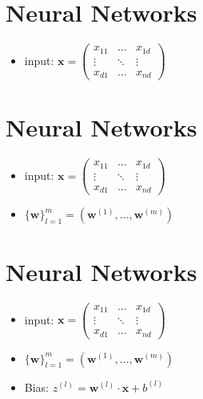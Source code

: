 \documentclass[11pt]{article}
\begin{document}
\newpage
\hypertarget{neural-networks}{%
\section*{Neural Networks}\label{neural-networks1}}

\begin{itemize}
    \item input: $\boldsymbol{x} = 
        \begin{pmatrix}
            x_{11} & \dots & x_{1d} \\
            \vdots & \ddots & \vdots \\
            x_{d1} & \dots & x_{nd}
        \end{pmatrix}$
\end{itemize}

\newpage
\hypertarget{neural-networks}{%
\section*{Neural Networks}\label{neural-networks2}}

\begin{itemize}
    \item input: $\boldsymbol{x} = 
        \begin{pmatrix}
            x_{11} & \dots & x_{1d} \\
            \vdots & \ddots & \vdots \\
            x_{d1} & \dots & x_{nd}
        \end{pmatrix}$
    \item $\{\boldsymbol{w}\}^m_{l=1} = \left(\boldsymbol{w}^{(1)},\dots,\boldsymbol{w}^{(m)}\right)$
\end{itemize}

\newpage
\hypertarget{neural-networks}{%
\section*{Neural Networks}\label{neural-networks3}}

\begin{itemize}
    \item input: $\boldsymbol{x} = 
        \begin{pmatrix}
            x_{11} & \dots & x_{1d} \\
            \vdots & \ddots & \vdots \\
            x_{d1} & \dots & x_{nd}
        \end{pmatrix}$
    \item $\{\boldsymbol{w}\}^m_{l=1} = \left(\boldsymbol{w}^{(1)},\dots,\boldsymbol{w}^{(m)}\right)$
    \item Bias: $z^{(l)} = \boldsymbol{w}^{(l)}\cdot \boldsymbol{x} + b^{(l)}$
\end{itemize}
\end{document}
